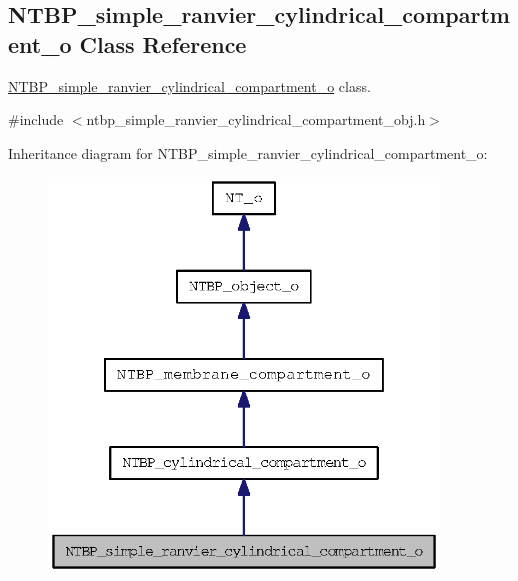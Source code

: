 \subsection{NTBP\_\-simple\_\-ranvier\_\-cylindrical\_\-compartment\_\-o Class Reference}
\label{class_n_t_b_p__simple__ranvier__cylindrical__compartment__o}


\hyperlink{class_n_t_b_p__simple__ranvier__cylindrical__compartment__o}{NTBP\_\-simple\_\-ranvier\_\-cylindrical\_\-compartment\_\-o} class.  




{\ttfamily \#include $<$ntbp\_\-simple\_\-ranvier\_\-cylindrical\_\-compartment\_\-obj.h$>$}



Inheritance diagram for NTBP\_\-simple\_\-ranvier\_\-cylindrical\_\-compartment\_\-o:
\nopagebreak
\begin{figure}[H]
\begin{center}
\leavevmode
\includegraphics[width=294pt]{class_n_t_b_p__simple__ranvier__cylindrical__compartment__o__inherit__graph}
\end{center}
\end{figure}


